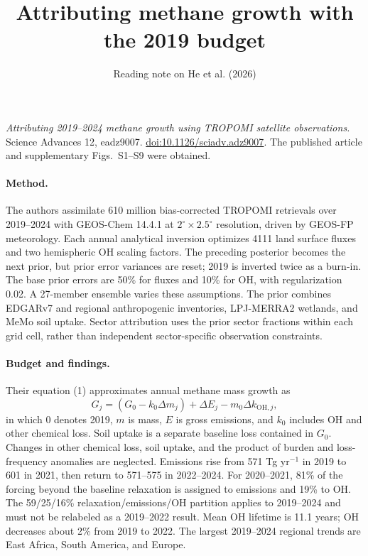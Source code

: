 \documentclass[11pt]{article}
\title{Attributing methane growth with the 2019 budget}
\author{Reading note on He et al. (2026)}
\date{}
\begin{document}
\maketitle
\noindent\textit{Attributing 2019--2024 methane growth using TROPOMI satellite observations.}
Science Advances 12, eadz9007.
\href{https://doi.org/10.1126/sciadv.adz9007}{doi:10.1126/sciadv.adz9007}.
The published article and supplementary Figs.~S1--S9 were obtained.

\paragraph{Method.}
The authors assimilate 610 million bias-corrected TROPOMI retrievals
over 2019--2024 with GEOS-Chem 14.4.1 at $2^\circ\times2.5^\circ$
resolution, driven by GEOS-FP meteorology. Each annual analytical
inversion optimizes 4111 land surface fluxes and two hemispheric OH
scaling factors. The preceding posterior becomes the next prior, but
prior error variances are reset; 2019 is inverted twice as a burn-in.
The base prior errors are 50\% for fluxes and 10\% for OH, with
regularization 0.02. A 27-member ensemble varies these assumptions.
The prior combines EDGARv7 and regional anthropogenic inventories,
LPJ-MERRA2 wetlands, and MeMo soil uptake. Sector attribution uses
the prior sector fractions within each grid cell, rather than independent
sector-specific observation constraints.

\paragraph{Budget and findings.}
Their equation (1) approximates annual methane mass growth as
\begin{equation}
G_j=(G_0-k_0\Delta m_j)+\Delta E_j-m_0\Delta k_{\mathrm{OH},j},
\end{equation}
in which 0 denotes 2019, $m$ is mass, $E$ is gross emissions, and
$k_0$ includes OH and other chemical loss. Soil uptake is a separate
baseline loss contained in $G_0$. Changes in other chemical loss,
soil uptake, and the product of burden and loss-frequency anomalies
are neglected. Emissions rise from 571 Tg yr$^{-1}$ in 2019 to
601 in 2021, then return to 571--575 in 2022--2024. For 2020--2021,
81\% of the forcing beyond the baseline relaxation is assigned to
emissions and 19\% to OH. The 59/25/16\% relaxation/emissions/OH
partition applies to 2019--2024 and must not be relabeled as a
2019--2022 result. Mean OH lifetime is 11.1 years; OH decreases
about 2\% from 2019 to 2022. The largest 2019--2024 regional trends
are East Africa, South America, and Europe.
\end{document}
